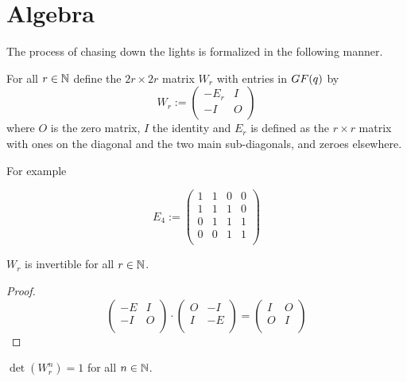 \section{Algebra}

The process of chasing down the lights is formalized in the following
manner.

For all $r\in\mathbb{N}$ define the $2r\times 2r$ matrix
$W_{r}$ with entries in $GF(q)$ by
\[
W_{r} := \left(
\begin{array}{cc}
  -E_{r} & I \\
  -I    & O \\
\end{array}
\right)
\]
where $O$ is the zero matrix, $I$ the identity and $E_{r}$ is defined
as the $r\times r$ matrix with ones on the diagonal and the two main
sub-diagonals, and zeroes elsewhere.

For example

\[
E_{4} := \left(
\begin{array}{cccc}
  1 & 1 & 0 & 0 \\
  1 & 1 & 1 & 0 \\
  0 & 1 & 1 & 1 \\
  0 & 0 & 1 & 1 \\
\end{array}
\right)
\]

\begin{lemma}
  $W_{r}$ is invertible for all $r\in\mathbb{N}$.
\end{lemma}

\begin{proof}
  \[
  \left(
  \begin{array}{cc}
    -E & I \\
    -I & O \\
  \end{array}
  \right)
  \cdot
  \left(
  \begin{array}{cc}
    O & -I  \\
    I & -E \\
  \end{array}
  \right)
  =
  \left(
  \begin{array}{cc}
    I & O \\
    O & I \\
  \end{array}
  \right)
  \]
\end{proof}


\begin{lemma}
  $\det(W_{r}^{n}) = 1$ for all $n\in\mathbb{N}$.
\end{lemma}

